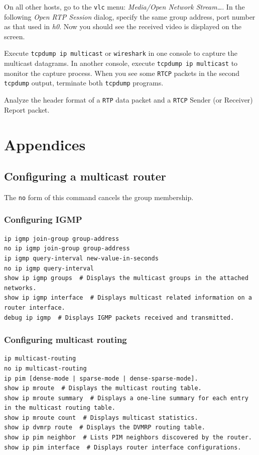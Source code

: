 \documentclass{../UTNetLab}
\begin{document}
    On all other hosts, go to the \lstinline{vlc} menu: \textit{Media/Open Network Stream\ldots}. In the following \textit{Open RTP Session} dialog, specify the same group address, port number as that used in \textit{h0}.%
    Now you should see the received video is displayed on the screen. 

    Execute \lstinline{tcpdump ip multicast} or \lstinline{wireshark} in one console to capture the multicast datagrams.
    In another console, execute \lstinline{tcpdump ip multicast} to monitor the capture process.
    When you see some \texttt{RTCP} packets in the second \lstinline{tcpdump} output, terminate both \lstinline{tcpdump} programs. 

    Analyze the header format of a \texttt{RTP} data packet and a \texttt{RTCP} Sender (or Receiver) Report packet.


    \appendix
\section*{Appendices}
\renewcommand{\thesubsection}{\Alph{subsection}}

\subsection{Configuring a multicast router}
The \lstinline[language={cisco}]{no} form of this command cancels the group membership.
\subsubsection{Configuring IGMP}
\begin{lstlisting}[language={cisco}, emph={new-value-in-seconds, }]
ip igmp join-group group-address
no ip igmp join-group group-address
ip igmp query-interval new-value-in-seconds
no ip igmp query-interval
show ip igmp groups  # Displays the multicast groups in the attached networks.
show ip igmp interface  # Displays multicast related information on a router interface.
debug ip igmp  # Displays IGMP packets received and transmitted.
\end{lstlisting}

\subsubsection{Configuring multicast routing}
\begin{lstlisting}[language={cisco}]
ip multicast-routing
no ip multicast-routing
ip pim [dense-mode | sparse-mode | dense-sparse-mode].
show ip mroute  # Displays the multicast routing table.
show ip mroute summary  # Displays a one-line summary for each entry in the multicast routing table.
show ip mroute count  # Displays multicast statistics.
show ip dvmrp route  # Displays the DVMRP routing table.
show ip pim neighbor  # Lists PIM neighbors discovered by the router.
show ip pim interface  # Displays router interface configurations.
\end{lstlisting}
\end{document}
